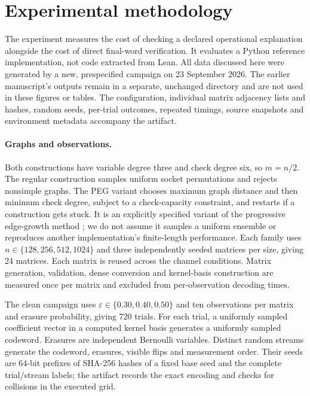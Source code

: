 \section{Experimental methodology}\label{sec:experiments}
The experiment measures the cost of checking a declared operational
explanation alongside the cost of direct final-word verification.
It evaluates a Python reference implementation, not code extracted
from Lean. All data discussed here were generated by a new,
prespecified campaign on 23 September 2026. The earlier manuscript's
outputs remain in a separate, unchanged directory and are not used in
these figures or tables. The configuration, individual matrix adjacency
lists and hashes, random seeds, per-trial outcomes, repeated timings,
source snapshots and environment metadata accompany the artifact.

\paragraph{Graphs and observations.}
Both constructions have variable degree three and check degree six,
so $m=n/2$. The regular construction samples uniform socket
permutations and rejects nonsimple graphs. The PEG variant chooses
maximum graph distance and then minimum check degree, subject to a
check-capacity constraint, and restarts if a construction gets stuck.
It is an explicitly specified variant of the progressive edge-growth
method \cite{HuEleftheriouArnold2005PEG}; we do not assume it samples a
uniform ensemble or reproduces another implementation's finite-length
performance. Each family uses $n\in\{128,256,512,1024\}$ and three
independently seeded matrices per size, giving 24 matrices. Each matrix
is reused across the channel conditions. Matrix generation, validation,
dense conversion and kernel-basis construction are measured once per
matrix and excluded from per-observation decoding times.

The clean campaign uses $\varepsilon\in\{0.30,0.40,0.50\}$ and ten
observations per matrix and erasure probability, giving 720 trials.
For each trial, a uniformly sampled coefficient vector in a computed
kernel basis generates a uniformly sampled codeword. Erasures are
independent Bernoulli variables. Distinct random streams generate the
codeword, erasures, visible flips and measurement order. Their seeds
are 64-bit prefixes of SHA-256 hashes of a fixed base seed and the
complete trial/stream labels; the artifact records the exact encoding
and checks for collisions in the executed grid.

